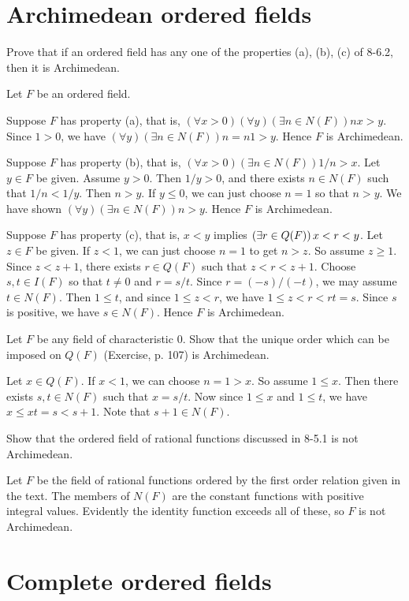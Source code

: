 \section{Archimedean ordered fields}

\begin{exercise}
Prove that if an ordered field has any one of the properties (a), (b), (c) of 8-6.2,
then it is Archimedean.
\end{exercise}

\begin{solution}
Let $F$ be an ordered field.

Suppose $F$ has property (a), that is,
$(\forall x > 0)(\forall y)(\exists n\in N(F)) nx > y$. Since $1>0$, we have
$(\forall y)(\exists n\in N(F)) n = n1 > y$. Hence $F$ is Archimedean.

Suppose $F$ has property (b), that is,
$(\forall x > 0)(\exists n\in N(F)) 1/n > x$.
Let $y\in F$ be given. Assume $y > 0$. Then $1/y > 0$, and there exists $n\in N(F)$
such that $1/n < 1/y$. Then $n > y$. If $y\leq 0$, we can just choose $n=1$ so that $n > y$.
We have shown $(\forall y)(\exists n\in N(F)) n > y$. Hence $F$ is Archimedean.

Suppose $F$ has property (c), that is, $x<y$ implies $(\exists r\in Q(F))\thinspace x < r < y$.
Let $z\in F$ be given.
If $z < 1$, we can just choose $n=1$ to get $n>z$. So assume $z\geq 1$.
Since $z < z + 1$, there exists $r\in Q(F)$ such that $z < r < z + 1$.
Choose $s,t\in I(F)$ so that $t\neq 0$ and $r = s/t$. Since $r=(-s)/(-t)$, we may assume
$t \in N(F)$. Then $1\leq t$, and since $1\leq z < r$, we have $1\leq z < r < rt = s$.
Since $s$ is positive, we have $s\in N(F)$.
Hence $F$ is Archimedean.
\end{solution}

\begin{exercise}
Let $F$ be any field of characteristic $0$. Show that the unique order which can be
imposed on $Q(F)$ (Exercise, p. 107) is Archimedean.
\end{exercise}

\begin{solution}
Let $x\in Q(F)$. If $x< 1$, we can choose $n=1>x$. So assume $1\leq x$.
Then there exists $s,t\in N(F)$ such that $x=s/t$.
Now since $1\leq x$ and $1\leq t$, we have $x\leq xt=s < s + 1$.
Note that $s+1\in N(F)$.
\end{solution}

\begin{exercise}
Show that the ordered field of rational functions discussed in 8-5.1 is not Archimedean.
\end{exercise}

\begin{solution}
Let $F$ be the field of rational functions ordered by the first order relation given in the text. The
members of $N(F)$ are the constant functions with positive integral values. Evidently the
identity function exceeds all of these, so $F$ is not Archimedean.
\end{solution} 

\section{Complete ordered fields}


